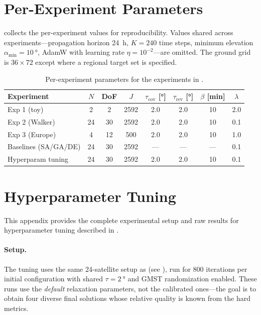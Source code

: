 \appendix

\section{Per-Experiment Parameters}
\label{app:exp_params}

 collects the per-experiment values for reproducibility. Values shared across experiments---propagation horizon \SI{24}{\hour}, $K=240$ time steps, minimum elevation $\alpha_{\min} = \SI{10}{\degree}$, AdamW with learning rate $\eta=10^{-2}$---are omitted. The ground grid is $36 \times 72$ except where a regional target set is specified.

\begin{table}[!htb]
\centering
\caption{Per-experiment parameters for the experiments in .}
\label{tab:exp_params}
\begin{tabular}{lccccccc}
\toprule
\textbf{Experiment} & $N$ & \textbf{DoF} & $J$ & $\tau_{\text{cov}}$ [\si{\degree}] & $\tau_{\text{rev}}$ [\si{\degree}] & $\beta$ [\si{\minute}] & $\lambda$ \\
\midrule
Exp 1 (toy)           &  2 &  2 & 2592 & 2.0 & 2.0 & 10 & 2.0 \\
Exp 2 (Walker)        & 24 & 30 & 2592 & 2.0 & 2.0 & 10 & 0.1 \\
Exp 3 (Europe)        &  4 & 12 &  500 & 2.0 & 2.0 & 10 & 1.0 \\
Baselines (SA/GA/DE)  & 24 & 30 & 2592 & --- & --- & ---& 0.1 \\
Hyperparam tuning     & 24 & 30 & 2592 & 2.0 & 2.0 & 10 & 0.1 \\
\bottomrule
\end{tabular}
\end{table}

\section{Hyperparameter Tuning}
\label{app:hyperparam_grid}

This appendix provides the complete experimental setup and raw results for hyperparameter tuning described in .

\paragraph{Setup.}
The tuning uses the same 24-satellite setup as  (see ), run for 800 iterations per initial configuration with shared $\tau = \SI{2}{\degree}$ and GMST randomization enabled. These runs use the \emph{default} relaxation parameters, not the calibrated ones---the goal is to obtain four diverse final solutions whose relative quality is known from the hard metrics.

